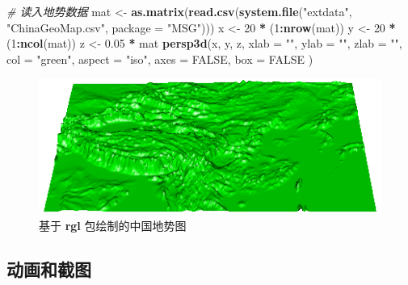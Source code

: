 \documentclass[
  b5paper,
  UTF8,twoside]{book}
\newenvironment{Shaded}{\begin{snugshade}}{\end{snugshade}}
\newcommand{\AttributeTok}[1]{\textcolor[rgb]{0.13,0.29,0.53}{#1}}
\newcommand{\CommentTok}[1]{\textcolor[rgb]{0.56,0.35,0.01}{\textit{#1}}}
\newcommand{\ConstantTok}[1]{\textcolor[rgb]{0.56,0.35,0.01}{#1}}
\newcommand{\DecValTok}[1]{\textcolor[rgb]{0.00,0.00,0.81}{#1}}
\newcommand{\FloatTok}[1]{\textcolor[rgb]{0.00,0.00,0.81}{#1}}
\newcommand{\FunctionTok}[1]{\textcolor[rgb]{0.13,0.29,0.53}{\textbf{#1}}}
\newcommand{\NormalTok}[1]{#1}
\newcommand{\OtherTok}[1]{\textcolor[rgb]{0.56,0.35,0.01}{#1}}
\newcommand{\SpecialCharTok}[1]{\textcolor[rgb]{0.81,0.36,0.00}{\textbf{#1}}}
\newcommand{\StringTok}[1]{\textcolor[rgb]{0.31,0.60,0.02}{#1}}
\begin{document}
\begin{Shaded}
\begin{Highlighting}[]
\CommentTok{\# 读入地势数据}
\NormalTok{mat }\OtherTok{\textless{}{-}} \FunctionTok{as.matrix}\NormalTok{(}\FunctionTok{read.csv}\NormalTok{(}\FunctionTok{system.file}\NormalTok{(}\StringTok{"extdata"}\NormalTok{, }\StringTok{"ChinaGeoMap.csv"}\NormalTok{, }\AttributeTok{package =} \StringTok{"MSG"}\NormalTok{)))}
\NormalTok{x }\OtherTok{\textless{}{-}} \DecValTok{20} \SpecialCharTok{*}\NormalTok{ (}\DecValTok{1}\SpecialCharTok{:}\FunctionTok{nrow}\NormalTok{(mat))}
\NormalTok{y }\OtherTok{\textless{}{-}} \DecValTok{20} \SpecialCharTok{*}\NormalTok{ (}\DecValTok{1}\SpecialCharTok{:}\FunctionTok{ncol}\NormalTok{(mat))}
\NormalTok{z }\OtherTok{\textless{}{-}} \FloatTok{0.05} \SpecialCharTok{*}\NormalTok{ mat}
\FunctionTok{persp3d}\NormalTok{(x, y, z,}
  \AttributeTok{xlab =} \StringTok{""}\NormalTok{, }\AttributeTok{ylab =} \StringTok{""}\NormalTok{, }\AttributeTok{zlab =} \StringTok{""}\NormalTok{,}
  \AttributeTok{col =} \StringTok{"green"}\NormalTok{, }\AttributeTok{aspect =} \StringTok{"iso"}\NormalTok{, }\AttributeTok{axes =} \ConstantTok{FALSE}\NormalTok{, }\AttributeTok{box =} \ConstantTok{FALSE}
\NormalTok{)}
\end{Highlighting}
\end{Shaded}

\begin{figure}

{\centering \includegraphics{images/rgl-china-map} 

}

\caption[基于 \textbf{rgl} 包绘制的中国地势图]{基于 \textbf{rgl} 包绘制的中国地势图}\label{fig:rgl-china-map}
\end{figure}





\subsection{动画和截图}\label{ux52a8ux753bux548cux622aux56fe}
\end{document}
